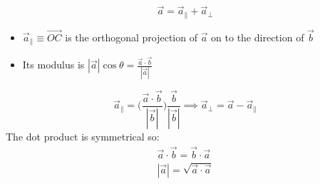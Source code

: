 \documentclass[a4paper, 11pt, normalem]{report}
\begin{document}
\begin{equation*}
    \vec{a} = \vec{a}_{\parallel} + \vec{a}_{\perp}
\end{equation*}
\begin{itemize}
    \item $\vec{a}_{\parallel} \equiv \vec{OC}$ is the orthogonal projection of $\vec{a}$ on to the direction of $\vec{b}$
    \item Its modulus is $|\vec{a}|\cos\theta = \frac{\vec{a} \cdot \vec{b}}{|\vec{a}|}$
\end{itemize}
\begin{equation*}
    \vec{a}_{\parallel} = \Bigg(\frac{\vec{a} \cdot \vec{b}}{|\vec{b}|}\Bigg) \frac{\vec{b}}{|\vec{b}|} \implies \vec{a}_{\perp} = \vec{a} - \vec{a}_{\parallel}
\end{equation*}
The dot product is symmetrical so:
\begin{gather*}
    \vec{a} \cdot \vec{b} = \vec{b} \cdot \vec{a} \\
    |\vec{a}| = \sqrt{\vec{a} \cdot \vec{a}}
\end{gather*}

\newpage
\end{document}
